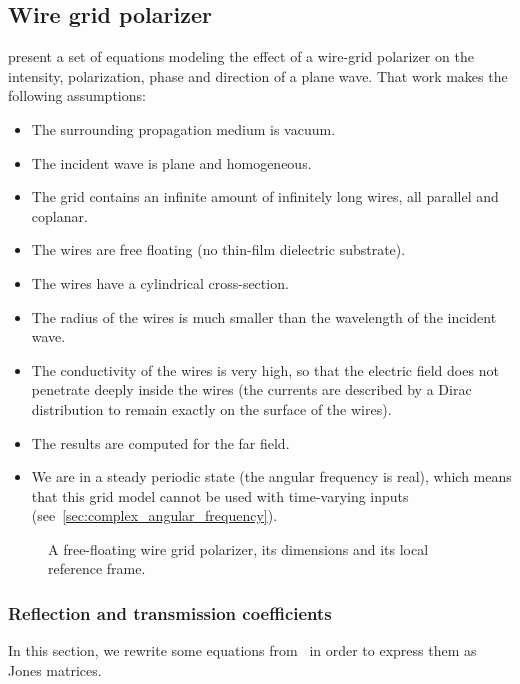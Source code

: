 \begin{refsection}
\subsection{Wire grid polarizer}
\label{sec:wire_grid_polarizer}
\Textcite{houde_2001} present a set of equations modeling the effect of a wire-grid polarizer on the intensity, polarization, phase and direction of a plane wave.
That work makes the following assumptions:
\begin{itemize}
    \item The surrounding propagation medium is vacuum.
    \item The incident wave is plane and homogeneous.
    \item The grid contains an infinite amount of infinitely long wires, all parallel and coplanar.
    \item The wires are free floating (no thin-film dielectric substrate).
    \item The wires have a cylindrical cross-section.
    \item The radius of the wires is much smaller than the wavelength of the incident wave.
    \item The conductivity of the wires is very high, so that the electric field does not penetrate deeply inside the wires (the currents are described by a Dirac distribution to remain exactly on the surface of the wires).
    \item The results are computed for the far field.
    \item We are in a steady periodic state (the angular frequency is real), which means that this grid model cannot be used with time-varying inputs (see~\cref{sec:complex_angular_frequency}).
\end{itemize}

\begin{figure}
    \centering
    \footnotesize
    
    \caption{A free-floating wire grid polarizer, its dimensions and its local reference frame.}
    \label{fig:grid}
\end{figure}

\subsubsection{Reflection and transmission coefficients}
In this section, we rewrite some equations from~\textcite{houde_2001} in order to express them as Jones matrices.


\end{refsection}
